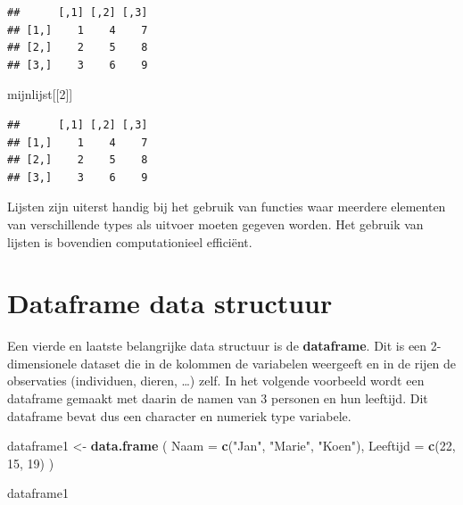 \documentclass[
]{book}
\newenvironment{Shaded}{\begin{snugshade}}{\end{snugshade}}
\newcommand{\AttributeTok}[1]{\textcolor[rgb]{0.13,0.29,0.53}{#1}}
\newcommand{\DecValTok}[1]{\textcolor[rgb]{0.00,0.00,0.81}{#1}}
\newcommand{\FunctionTok}[1]{\textcolor[rgb]{0.13,0.29,0.53}{\textbf{#1}}}
\newcommand{\NormalTok}[1]{#1}
\newcommand{\OtherTok}[1]{\textcolor[rgb]{0.56,0.35,0.01}{#1}}
\newcommand{\SpecialCharTok}[1]{\textcolor[rgb]{0.81,0.36,0.00}{\textbf{#1}}}
\newcommand{\StringTok}[1]{\textcolor[rgb]{0.31,0.60,0.02}{#1}}
\begin{document}
\begin{Shaded}
\end{Shaded}

\begin{verbatim}
##      [,1] [,2] [,3]
## [1,]    1    4    7
## [2,]    2    5    8
## [3,]    3    6    9
\end{verbatim}

\begin{Shaded}
\begin{Highlighting}[]
\NormalTok{mijnlijst[[}\DecValTok{2}\NormalTok{]]}
\end{Highlighting}
\end{Shaded}

\begin{verbatim}
##      [,1] [,2] [,3]
## [1,]    1    4    7
## [2,]    2    5    8
## [3,]    3    6    9
\end{verbatim}

Lijsten zijn uiterst handig bij het gebruik van functies waar meerdere elementen van verschillende types als uitvoer moeten gegeven worden. Het gebruik van lijsten is bovendien computationieel efficiënt.

\hypertarget{dataframe-data-structuur}{%
\section{Dataframe data structuur}\label{dataframe-data-structuur}}

Een vierde en laatste belangrijke data structuur is de \textbf{dataframe}. Dit is een 2-dimensionele dataset die in de kolommen de variabelen weergeeft en in de rijen de observaties (individuen, dieren, \ldots) zelf. In het volgende voorbeeld wordt een dataframe gemaakt met daarin de namen van 3 personen en hun leeftijd. Dit dataframe bevat dus een character en numeriek type variabele.

\begin{Shaded}
\begin{Highlighting}[]
\NormalTok{dataframe1 }\OtherTok{\textless{}{-}} \FunctionTok{data.frame}\NormalTok{ (}
  \AttributeTok{Naam =} \FunctionTok{c}\NormalTok{(}\StringTok{"Jan"}\NormalTok{, }\StringTok{"Marie"}\NormalTok{, }\StringTok{"Koen"}\NormalTok{),}
  \AttributeTok{Leeftijd =} \FunctionTok{c}\NormalTok{(}\DecValTok{22}\NormalTok{, }\DecValTok{15}\NormalTok{, }\DecValTok{19}\NormalTok{)}
\NormalTok{)}

\NormalTok{dataframe1}
\end{Highlighting}
\end{Shaded}
\end{document}
